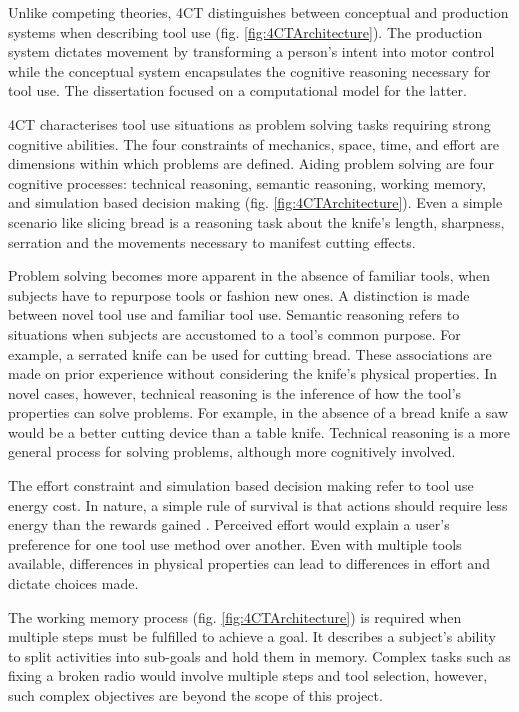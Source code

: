 \documentclass[11]{article}
\begin{document}
Unlike competing theories, 4CT distinguishes between conceptual and production systems when describing tool use (fig. \ref{fig:4CTArchitecture}).
The production system dictates movement by transforming a person's intent into motor control while the conceptual system encapsulates the cognitive reasoning necessary for tool use.
The dissertation focused on a computational model for the latter.



4CT characterises tool use situations as problem solving tasks requiring strong cognitive abilities. 
The four constraints of mechanics, space, time, and effort are dimensions within which problems are defined.
Aiding problem solving are four cognitive processes: technical reasoning, semantic reasoning, working memory, and simulation based decision making (fig. \ref{fig:4CTArchitecture}).  
Even a simple scenario like slicing bread is a reasoning task about the knife's length, sharpness, serration and the movements necessary to manifest cutting effects. 

Problem solving becomes more apparent in the absence of familiar tools, when subjects have to repurpose tools or fashion new ones.
A distinction is made between novel tool use and familiar tool use. 
Semantic reasoning refers to situations when subjects are accustomed to a tool's common purpose. 
For example, a serrated knife can be used for cutting bread. 
These associations are made on prior experience without considering the knife's physical properties.  
In novel cases, however, technical reasoning is the inference of how the tool's properties can solve problems.
For example, in the absence of a bread knife a saw would be a better cutting device than a table knife. 
Technical reasoning is a more general process for solving problems, although more cognitively involved.  

The effort constraint and simulation based decision making refer to tool use energy cost. 
In nature, a simple rule of survival is that actions should require less energy than the rewards gained \cite{proffitt2006}.
Perceived effort would explain a user's preference for one tool use method over another. 
Even with multiple tools available, differences in physical properties can lead to differences in effort and dictate choices made. 

The working memory process (fig. \ref{fig:4CTArchitecture}) is required when multiple steps must be fulfilled to achieve a goal. 
It describes a subject's ability to split activities into sub-goals and hold them in memory. 
Complex tasks such as fixing a broken radio would involve multiple steps and tool selection, however, such complex objectives are beyond the scope of this project.
\end{document}
